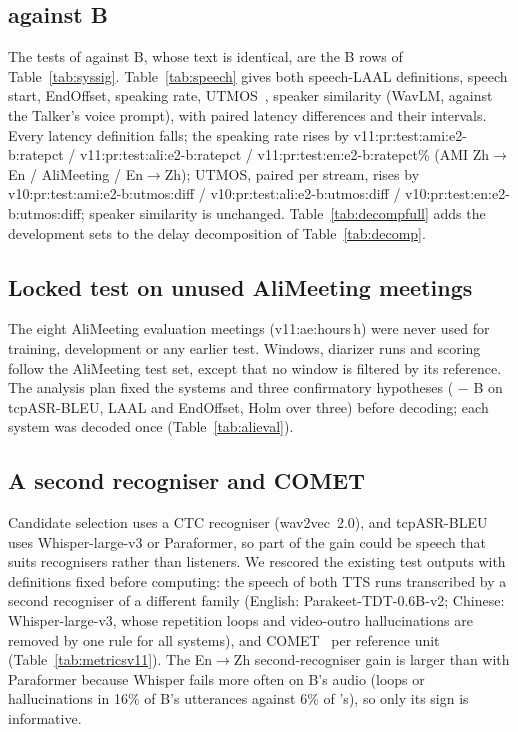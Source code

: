 \subsection{\sys{} against B}
The tests of \sys{} against B, whose text is identical, are the B rows of Table~\ref{tab:syssig}.
Table~\ref{tab:speech} gives both speech-LAAL definitions, speech start, EndOffset, speaking rate,
UTMOS~\citep{saeki2022utmos}, speaker similarity (WavLM, against the Talker's voice prompt), with paired
latency differences and their intervals. Every latency definition falls; the speaking rate rises by
\num{v11:pr:test:ami:e2-b:ratepct} / \num{v11:pr:test:ali:e2-b:ratepct} / \num{v11:pr:test:en:e2-b:ratepct}\%
(AMI Zh$\rightarrow$En / AliMeeting / En$\rightarrow$Zh); UTMOS, paired per stream, rises by
\num{v10:pr:test:ami:e2-b:utmos:diff} / \num{v10:pr:test:ali:e2-b:utmos:diff} / \num{v10:pr:test:en:e2-b:utmos:diff};
speaker similarity is unchanged. Table~\ref{tab:decompfull} adds the
development sets to the delay decomposition of Table~\ref{tab:decomp}.



\ifAliEval
\subsection{Locked test on unused AliMeeting meetings}
\label{app:alieval}
The eight AliMeeting evaluation meetings (\num{v11:ae:hours}\,h) were never used for training, development or any
earlier test. Windows, diarizer runs and scoring follow the AliMeeting test set, except that no window is filtered by
its reference. The analysis plan fixed the systems and three confirmatory hypotheses (\sys{} $-$ B on tcpASR-BLEU, LAAL
and EndOffset, Holm over three) before decoding; each system was decoded once (Table~\ref{tab:alieval}).

\fi

\ifMetricsV
\subsection{A second recogniser and COMET}
\label{app:metricsv11}
Candidate selection uses a CTC recogniser (wav2vec~2.0), and tcpASR-BLEU uses Whisper-large-v3 or Paraformer, so part
of the gain could be speech that suits recognisers rather than listeners. We rescored the existing test outputs with
definitions fixed before computing: the speech of both TTS runs transcribed by a second recogniser of a different
family (English: Parakeet-TDT-0.6B-v2; Chinese: Whisper-large-v3, whose repetition loops and video-outro hallucinations
are removed by one rule for all systems), and COMET~\citep{rei2022comet} per reference unit (Table~\ref{tab:metricsv11}).
The En$\rightarrow$Zh second-recogniser gain is larger than with Paraformer because Whisper fails more often on B's
audio (loops or hallucinations in 16\% of B's utterances against 6\% of \sys{}'s), so only its sign is informative.

\fi

